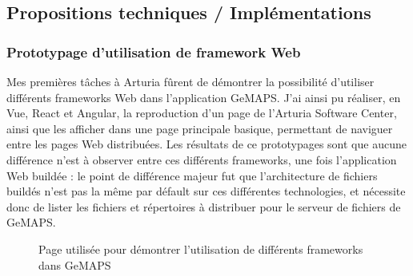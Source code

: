 \documentclass[francais]{rapportPFE}  %
\begin{document}
\subsection{Propositions techniques / Implémentations}
\subsubsection{Prototypage d'utilisation de framework Web}
Mes premières tâches à Arturia fûrent de démontrer la possibilité d'utiliser différents frameworks Web dans l'application GeMAPS.
J'ai ainsi pu réaliser, en Vue, React et Angular, la reproduction d'un page de l'Arturia Software Center, ainsi que les afficher dans une page principale basique, permettant de naviguer entre les pages Web distribuées. 
Les résultats de ce prototypages sont que aucune différence n'est à observer entre ces différents frameworks, une fois l'application Web buildée : le point de différence majeur fut que l'architecture de fichiers buildés n'est pas la même par défault sur ces différentes technologies, et nécessite donc de lister les fichiers et répertoires à distribuer pour le serveur de fichiers de GeMAPS.



\begin{figure}%
    \centering
    \qquad
    \caption{Page utilisée pour démontrer l'utilisation de différents frameworks dans GeMAPS}%
    \label{fig:example}%
\end{figure}
\end{document}
